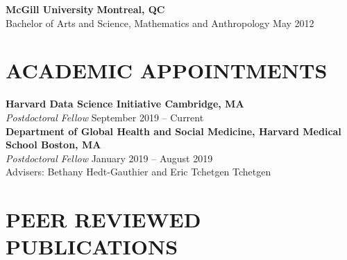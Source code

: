 \documentclass[12pt]{article}
\begin{document}
\textbf{McGill University} \hfill \hfill \textbf{Montreal, QC} \\
Bachelor of Arts and Science, Mathematics and Anthropology  \hfill \hfill May 2012 


\section*{\textbf{{\large A}CADEMIC {\large A}PPOINTMENTS }}

\textbf{Harvard Data Science Initiative \hfill \hfill Cambridge, MA} \\
\textit{Postdoctoral Fellow}  \hfill \hfill September 2019 -- Current \\

\textbf{Department of Global Health and Social Medicine, Harvard Medical School \hfill \hfill Boston, MA} \\
\textit{Postdoctoral Fellow} \hfill \hfill January 2019 -- August 2019 \\
Advisers: Bethany Hedt-Gauthier and Eric Tchetgen Tchetgen 

\section*{\textbf{{\large P}{EER} {\large R}{EVIEWED} {\large P}{UBLICATIONS}}}

\end{document}
